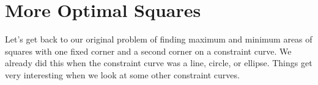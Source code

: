 




\section{More Optimal Squares}
\label{sec:more-optimal-squares}
Let's get back to our original problem of finding maximum and minimum
areas of squares with one fixed corner and a second corner on a
constraint curve.  We already did this when the constraint curve was a
line, circle, or ellipse.  Things get very interesting when we look at
some other constraint curves.

